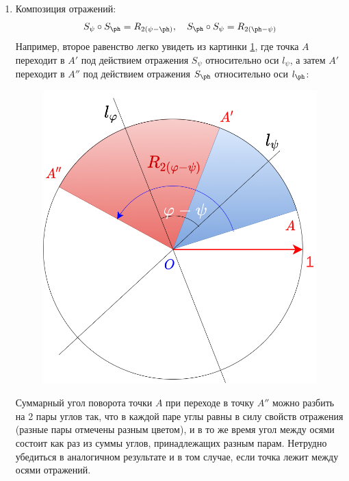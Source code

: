 \begin{enumerate}\setlength{\itemsep}{1pt}
\item Композиция отражений: 
\begin{equation}\label{SSR}
S_\psi\circ S_\ph=R_{2(\psi-\ph)},\quad S_\ph\circ S_\psi=R_{2(\ph-\psi)}
\end{equation}
Например, второе равенство легко увидеть из картинки \ref{Rund}, где точка $A$ переходит в $A'$ под действием отражения $S_\psi$ относительно оси $l_\psi$, а затем $A'$ переходит в $A''$ под действием отражения $S_\ph$ относительно оси $l_\ph$:

\begin{figure}[hbt!]
\begin{center}
\includegraphics[scale=0.25]{Rund.png}
\end{center}
\caption{}\label{Rund}
\end{figure}

Суммарный угол поворота точки $A$ при переходе в точку $A''$ можно разбить на 2 пары углов так, что в каждой паре углы равны в силу свойств отражения (разные пары отмечены разным цветом), и в то же время угол между осями состоит как раз из суммы углов, принадлежащих разным парам. Нетрудно убедиться в аналогичном результате и в том случае, если точка лежит между осями отражений.


\end{enumerate}

